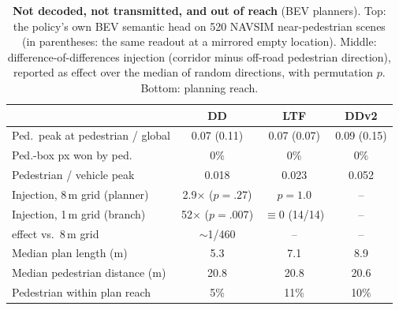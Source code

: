\begin{table}[t]
\centering
\caption{\textbf{Not decoded, not transmitted, and out of reach} (BEV planners). Top: the policy's own BEV
semantic head on 520 NAVSIM near-pedestrian scenes (in parentheses: the same readout at a mirrored empty location). Middle: difference-of-differences injection (corridor minus off-road pedestrian direction),
reported as effect over the median of random directions, with permutation $p$. Bottom: planning reach.}
\label{tab:mech}
\footnotesize
\setlength{\tabcolsep}{3pt}
\setlength{\tabcolsep}{2.5pt}
\begin{tabular}{@{}p{3.35cm}ccc@{}}
\toprule
 & DD & LTF & DDv2 \\
\midrule
Ped.\ peak at pedestrian / global & 0.07 (0.11) & 0.07 (0.07) & 0.09 (0.15) \\
Ped.-box px won by ped. & 0\% & 0\% & 0\% \\
Pedestrian / vehicle peak & 0.018 & 0.023 & 0.052 \\
\midrule
Injection, 8\,m grid (planner) & 2.9$\times$ ($p{=}.27$) & $p{=}1.0$ & -- \\
Injection, 1\,m grid (branch) & 52$\times$ ($p{=}.007$) & $\equiv0$ (14/14) & -- \\
\quad effect vs.\ 8\,m grid & $\sim$1/460 & -- & -- \\
\midrule
Median plan length (m) & 5.3 & 7.1 & 8.9 \\
Median pedestrian distance (m) & 20.8 & 20.8 & 20.6 \\
Pedestrian within plan reach & 5\% & 11\% & 10\% \\
\bottomrule
\end{tabular}
\end{table}
